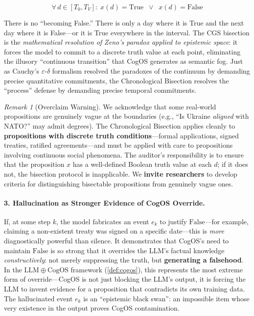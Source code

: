 \documentclass[11pt,a4paper]{article}
\theoremstyle{definition}
\theoremstyle{plain}
\theoremstyle{remark}
\newtheorem{remark}{Remark}[section]
\begin{document}
\begin{equation}\label{eq:excluded-middle}
  \forall\, d \in [T_0, T_V] : \; x(d) = \mathrm{True} \;\;\vee\;\; x(d) = \mathrm{False}
\end{equation}

There is no ``becoming False.'' There is only a day where it is True and the next day where it is False---or it is True everywhere in the interval. The CGS bisection is the \textit{mathematical resolution of Zeno's paradox applied to epistemic space}: it forces the model to commit to a discrete truth value at each point, eliminating the illusory ``continuous transition'' that CogOS generates as semantic fog. Just as Cauchy's $\varepsilon$-$\delta$ formalism resolved the paradoxes of the continuum by demanding precise quantitative commitments, the Chronological Bisection resolves the ``process'' defense by demanding precise temporal commitments.

\begin{remark}[Overclaim Warning]
We acknowledge that some real-world propositions are genuinely vague at the boundaries (e.g., ``Is Ukraine \emph{aligned} with NATO?'' may admit degrees). The Chronological Bisection applies cleanly to \textbf{propositions with discrete truth conditions}---formal applications, signed treaties, ratified agreements---and must be applied with care to propositions involving continuous social phenomena. The auditor's responsibility is to ensure that the proposition $x$ has a well-defined Boolean truth value at each $d$; if it does not, the bisection protocol is inapplicable. We \textbf{invite researchers} to develop criteria for distinguishing bisectable propositions from genuinely vague ones.
\end{remark}

\paragraph{3. Hallucination as Stronger Evidence of CogOS Override.}
If, at some step $k$, the model fabricates an event $e_k$ to justify $\mathrm{False}$---for example, claiming a non-existent treaty was signed on a specific date---this is \emph{more} diagnostically powerful than silence. It demonstrates that CogOS's need to maintain $\mathrm{False}$ is so strong that it overrides the LLM's factual knowledge \emph{constructively}: not merely suppressing the truth, but \textbf{generating a falsehood}. In the $\mathrm{LLM} \oplus \mathrm{CogOS}$ framework (\cref{def:cogos}), this represents the most extreme form of override---CogOS is not just blocking the LLM's output, it is forcing the LLM to invent evidence for a proposition that contradicts its own training data. The hallucinated event $e_k$ is an ``epistemic black swan'': an impossible item whose very existence in the output proves CogOS contamination.
\end{document}

